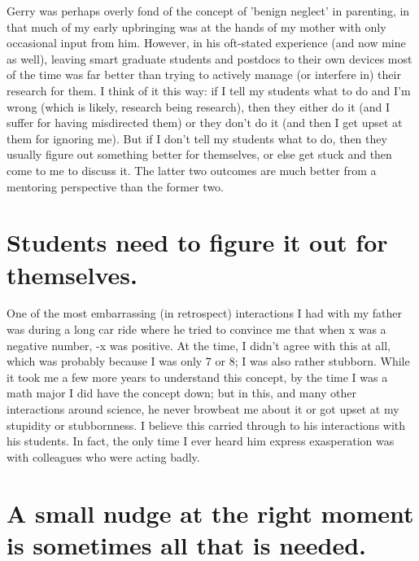 Gerry was perhaps overly fond of the concept of 'benign neglect' in
parenting, in that much of my early upbringing was at the hands of my
mother with only occasional input from him. However, in his oft-stated
experience (and now mine as well), leaving smart graduate students and
postdocs to their own devices most of the time was far better than
trying to actively manage (or interfere in) their research for them. I
think of it this way: if I tell my students what to do and I'm wrong
(which is likely, research being research), then they either do it
(and I suffer for having misdirected them) or they don't do it (and
then I get upset at them for ignoring me). But if I don't tell my
students what to do, then they usually figure out something better for
themselves, or else get stuck and then come to me to discuss it. The
latter two outcomes are much better from a mentoring perspective than
the former two.

\section{Students need to figure it out for themselves.}

One of the most embarrassing (in retrospect) interactions I had with
my father was during a long car ride where he tried to convince me
that when x was a negative number, -x was positive. At the time, I
didn't agree with this at all, which was probably because I was only 7
or 8; I was also rather stubborn. While it took me a few more years to
understand this concept, by the time I was a math major I did have the
concept down; but in this, and many other interactions around science,
he never browbeat me about it or got upset at my stupidity or
stubbornness. I believe this carried through to his interactions with
his students. In fact, the only time I ever heard him express
exasperation was with colleagues who were acting badly.

\section{A small nudge at the right moment is sometimes all that is needed.}

